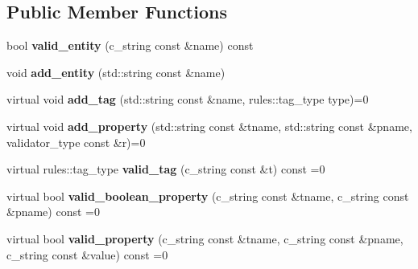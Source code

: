 \subsection*{Public Member Functions}
\begin{DoxyCompactItemize}
\item 
\hypertarget{structcppcms_1_1xss_1_1basic__rules__holder_a12f6deb237c207ce42d483bfce021ab8}{bool {\bfseries valid\-\_\-entity} (c\-\_\-string const \&name) const }\label{structcppcms_1_1xss_1_1basic__rules__holder_a12f6deb237c207ce42d483bfce021ab8}

\item 
\hypertarget{structcppcms_1_1xss_1_1basic__rules__holder_a264dd3d05b18096dbee38a91c8ceb2e9}{void {\bfseries add\-\_\-entity} (std\-::string const \&name)}\label{structcppcms_1_1xss_1_1basic__rules__holder_a264dd3d05b18096dbee38a91c8ceb2e9}

\item 
\hypertarget{structcppcms_1_1xss_1_1basic__rules__holder_a2fe20a7658a6f62cd8f691cf927c5e6a}{virtual void {\bfseries add\-\_\-tag} (std\-::string const \&name, rules\-::tag\-\_\-type type)=0}\label{structcppcms_1_1xss_1_1basic__rules__holder_a2fe20a7658a6f62cd8f691cf927c5e6a}

\item 
\hypertarget{structcppcms_1_1xss_1_1basic__rules__holder_a22e9229dde910fe9fe0ce38404160ae2}{virtual void {\bfseries add\-\_\-property} (std\-::string const \&tname, std\-::string const \&pname, validator\-\_\-type const \&r)=0}\label{structcppcms_1_1xss_1_1basic__rules__holder_a22e9229dde910fe9fe0ce38404160ae2}

\item 
\hypertarget{structcppcms_1_1xss_1_1basic__rules__holder_af728b490c8d36ef3158d1501bab5e497}{virtual rules\-::tag\-\_\-type {\bfseries valid\-\_\-tag} (c\-\_\-string const \&t) const =0}\label{structcppcms_1_1xss_1_1basic__rules__holder_af728b490c8d36ef3158d1501bab5e497}

\item 
\hypertarget{structcppcms_1_1xss_1_1basic__rules__holder_a9b78d1c3ffd2b86d0b4591392969cb87}{virtual bool {\bfseries valid\-\_\-boolean\-\_\-property} (c\-\_\-string const \&tname, c\-\_\-string const \&pname) const =0}\label{structcppcms_1_1xss_1_1basic__rules__holder_a9b78d1c3ffd2b86d0b4591392969cb87}

\item 
\hypertarget{structcppcms_1_1xss_1_1basic__rules__holder_a1a528fb3a35034d9fce54d9c82237633}{virtual bool {\bfseries valid\-\_\-property} (c\-\_\-string const \&tname, c\-\_\-string const \&pname, c\-\_\-string const \&value) const =0}\label{structcppcms_1_1xss_1_1basic__rules__holder_a1a528fb3a35034d9fce54d9c82237633}

\end{DoxyCompactItemize}
